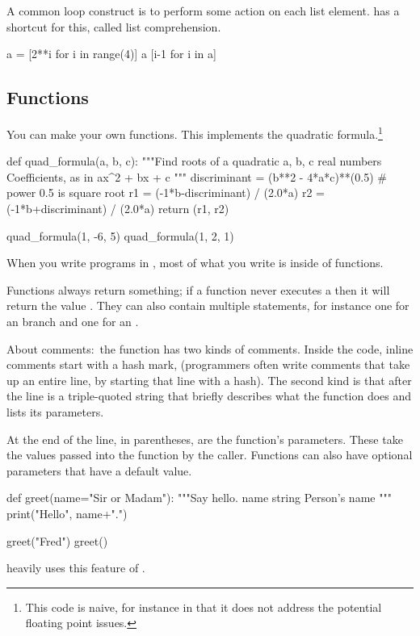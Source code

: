 A common loop construct is to perform some action
on each list element.
\python{} has a shortcut for this, called list comprehension.
\begin{pythonconsole}
a = [2**i for i in range(4)]
a
[i-1 for i in a]
\end{pythonconsole}



\subsection{Functions}
You can make your own functions.
This implements the quadratic formula.\footnote{%
  This code is naive, for instance in that it does not address the
  potential floating point issues.}
\begin{pythonconsole}
def quad_formula(a, b, c):
    """Find roots of a quadratic 
      a, b, c  real numbers  Coefficients, as in ax^2 + bx + c
    """
    discriminant = (b**2 - 4*a*c)**(0.5)  # power 0.5 is square root
    r1 = (-1*b-discriminant) / (2.0*a)
    r2 = (-1*b+discriminant) / (2.0*a)
    return (r1, r2)

quad_formula(1, -6, 5)
quad_formula(1, 2, 1)
\end{pythonconsole}
When you write programs in \python{}, most of what you write
is inside of functions. 

Functions always return something; 
if a function never executes a  then it will
return the value .
They can also contain multiple  statements, for instance 
one for an  branch and one for an .

About comments:~the  function has two kinds of 
comments.
Inside the code, inline comments start with a hash mark, \inlinecode{\#}
(programmers often write comments that take up an entire line, by starting 
that line with a hash). 
The second kind is that
after the  line is a triple-quoted string that
briefly describes
what the function does and lists its parameters.

At the end of the  line, in parentheses, are
the function's parameters. 
These take the values 
passed into the function by the caller.
Functions can also have optional parameters that have a default value.
\begin{pythonconsole}
def greet(name="Sir or Madam"):
    """Say hello.
      name  string  Person's name
    """
    print("Hello", name+".")

greet("Fred")
greet()
\end{pythonconsole}
\Sage{}  heavily uses this feature of \python{}.







